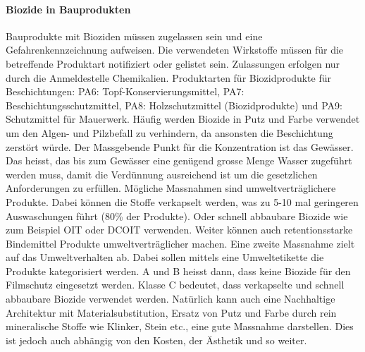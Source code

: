 \documentclass[9pt, openright=false]{scrartcl}
\begin{document}
\paragraph{Biozide in Bauprodukten} Bauprodukte mit Bioziden müssen zugelassen sein und eine Gefahrenkennzeichnung aufweisen. Die verwendeten Wirkstoffe müssen für die betreffende Produktart notifiziert oder gelistet sein. Zulassungen erfolgen nur durch die Anmeldestelle Chemikalien. Produktarten für Biozidprodukte für Beschichtungen: PA6: Topf-Konservierungsmittel, PA7: Beschichtungsschutzmittel, PA8: Holzschutzmittel (Biozidprodukte) und PA9: Schutzmittel für Mauerwerk. Häufig werden Biozide in Putz und Farbe verwendet um den Algen- und Pilzbefall zu verhindern, da ansonsten die Beschichtung zerstört würde. Der Massgebende Punkt für die Konzentration ist das Gewässer. Das heisst, das bis zum Gewässer eine genügend grosse Menge Wasser zugeführt werden muss, damit die Verdünnung ausreichend ist um die gesetzlichen Anforderungen zu erfüllen. Mögliche Massnahmen sind umweltverträglichere Produkte. Dabei können die Stoffe verkapselt werden, was zu 5-10 mal geringeren Auswaschungen führt (80\% der Produkte). Oder schnell abbaubare Biozide wie zum Beispiel OIT oder DCOIT verwenden. Weiter können auch retentionsstarke Bindemittel Produkte umweltverträglicher machen. Eine zweite Massnahme zielt auf das Umweltverhalten ab. Dabei sollen mittels eine Umweltetikette die Produkte kategorisiert werden. A und B heisst dann, dass keine Biozide für den Filmschutz eingesetzt werden. Klasse C bedeutet, dass verkapselte und schnell abbaubare Biozide verwendet werden. Natürlich kann auch eine Nachhaltige Architektur mit Materialsubstitution, Ersatz von Putz und Farbe durch rein mineralische Stoffe wie Klinker, Stein etc., eine gute Massnahme darstellen. Dies ist jedoch auch abhängig von den Kosten, der Ästhetik und so weiter.
\end{document}
